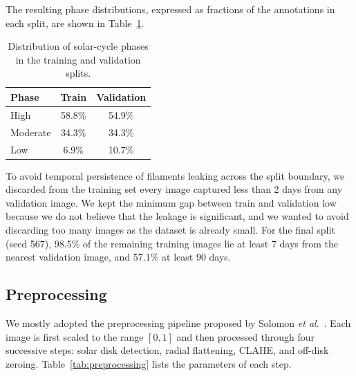 \documentclass[sigconf]{acmart}
\begin{document}
The resulting phase distributions, expressed as fractions of the annotations in each split, are shown in Table~\ref{tab:phase}.

\begin{table}[!htbp]
    \centering
    \caption{Distribution of solar-cycle phases in the training and validation splits.}
    \label{tab:phase}
    \small
    \begin{tabular}{lcc}
        \toprule
        \textbf{Phase} & \textbf{Train} & \textbf{Validation} \\
        \midrule
        High     & 58.8\% & 54.9\% \\
        Moderate & 34.3\% & 34.3\% \\
        Low      & 6.9\%  & 10.7\% \\
        \bottomrule
    \end{tabular}
\end{table}
\FloatBarrier

To avoid temporal persistence of filaments leaking across the split boundary, we discarded from the training set every image captured less than 2 days from any validation image. We kept the minimum gap between train and validation low because we do not believe that the leakage is significant, and we wanted to avoid discarding too many images as the dataset is already small. For the final split (seed 567), 98.5\% of the remaining training images lie at least 7 days from the nearest validation image, and 57.1\% at least 90 days.

\subsection{Preprocessing}\label{sec:preprocessing}

We mostly adopted the preprocessing pipeline proposed by Solomon \textit{et al}.~\cite{solomon2025edgeattnet}. Each image is first scaled to the range \([0,1]\) and then processed through four successive steps: solar disk detection, radial flattening, CLAHE, and off-disk zeroing. Table~\ref{tab:preprocessing} lists the parameters of each step.
\end{document}

